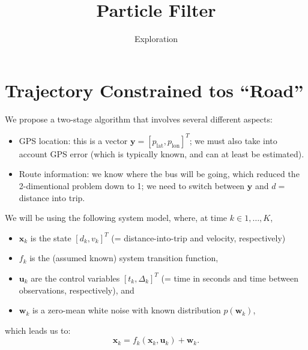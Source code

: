 \documentclass[11pt]{article}\usepackage[]{graphicx}\usepackage[]{color}
\title{Particle Filter}
\author{Exploration}
\date{}
\newcommand{\bx}{\boldsymbol{x}}
\newcommand{\bu}{\boldsymbol{u}}
\newcommand{\bw}{\boldsymbol{w}}
\newcommand{\by}{\boldsymbol{y}}
\begin{document}
\maketitle


\section{Trajectory Constrained tos ``Road''}


We propose a two-stage algorithm that involves several different aspects:

\begin{itemize}
\item GPS location: this is a vector $\by = \left[p_{\mathrm{lat}}, p_{\mathrm{lon}}\right]^T$; we
  must also take into account GPS error (which is typically known, and can at least be estimated).
  

\item Route information: we know where the bus will be going, which reduced the 2-dimentional
  problem down to 1; we need to switch between $\by$ and $d = $ distance into trip.
\end{itemize}


We will be using the following system model, where, at time $k \in 1,\ldots,K$, 
\begin{itemize}
\item 
  $\bx_k$ is the state $\left[d_k, v_k\right]^T$ (= distance-into-trip and velocity, respectively)
  
\item
  $f_k$ is the (assumed known) system transition function, 
  
\item
  $\bu_k$ are the control variables $\left[t_k, \Delta_k\right]^T$ (= time in seconds and time between
  observations, respectively), and
  
\item
  $\bw_k$ is a zero-mean white noise with known distribution $p(\bw_k)$,
  
\end{itemize}
which leads us to:
\begin{equation}
  \label{eq:state_model1}
  \bx_k = 
  f_k\left(\bx_k, \bu_k\right) + \bw_k.
\end{equation}
\end{document}
